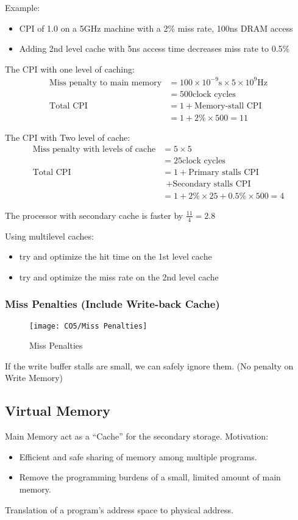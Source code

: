 Example: 
\begin{itemize}\small
    \item CPI of 1.0 on a 5GHz machine with a 2\% miss rate, 100ns DRAM access
    \item Adding 2nd level cache with 5ns access time decreases miss rate to 0.5\%
\end{itemize}{\small
    The CPI with one level of caching:
    \begin{align*}
        \text{Miss penalty to main memory}&=100\times10^{-9}\text{s}\times5\times10^9\text{Hz}\\
        &=500\text{clock cycles}\\
        \text{Total CPI}&=1+\text{Memory-stall CPI}\\
        &=1+2\%\times 500=11
    \end{align*}

    The CPI with Two level of cache:
    \begin{align*}
        \text{Miss penalty with levels of cache}&=5\times5\\
        &=25\text{clock cycles}\\
        \text{Total CPI}&=1+\text{Primary stalls CPI}\\
        &\ \ +\text{Secondary stalls CPI}\\
        &=1+2\%\times 25+0.5\%\times 500=4
    \end{align*}

    The processor with secondary cache is faster by $\frac{11}{4}=2.8$
}
Using multilevel caches:
\begin{itemize}\small
    \item try and optimize the hit time on the 1st level cache
    \item try and optimize the miss rate on the 2nd level cache
\end{itemize}

\subsubsection{Miss Penalties (Include Write-back Cache)}
\begin{figure}[!htb]
    \centering
    \texttt{[image: CO5/Miss Penalties]}
    \caption{Miss Penalties}
\end{figure}
If the write buffer stalls are small, we can safely ignore them. (No penalty on Write Memory)

\subsection{Virtual Memory}
Main Memory act as a ``Cache'' for the secondary storage. Motivation:
\begin{itemize}\small
    \item Efficient and safe sharing of memory among multiple programs.
    \item  Remove the programming burdens of a small, limited amount of main memory.
\end{itemize}
Translation of a program's address space to physical address. 

